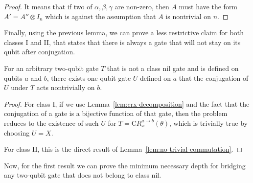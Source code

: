 \begin{proof}
  It means that if two of $\alpha, \beta, \gamma$ are non-zero, then $A$ must have the form $A' = A'' \otimes I_n$ which is against the assumption that $A$ is nontrivial on $n$.
\end{proof}

Finally, using the previous lemma, we can prove a less restrictive claim for both classes I and II, that states that there is always a gate that will not stay on its qubit after conjugation.

\begin{lemma}\label{lem:nontrivial-commutation}
    For an arbitrary two-qubit gate $T$ that is not a class nil gate and is defined on qubits $a$ and $b$, there exists one-qubit gate $U$ defined on $a$ that the conjugation of $U$ under $T$ acts nontrivially on $b$.
\end{lemma}
\begin{proof}
    For class I, if we use Lemma~\ref{lem:crx-decomposition} and the fact that the conjugation of a gate is a bijective function of that gate, then the problem reduces to the existence of such $U$ for $T = \mathrm{C}R_x^{a\to b}(\theta)$, which is trivially true by choosing $U = X$.

    For class II, this is the direct result of Lemma~\ref{lem:no-trivial-commutation}.
\end{proof}

Now, for the first result we can prove the minimum necessary depth for bridging any two-qubit gate that does not belong to class nil.

